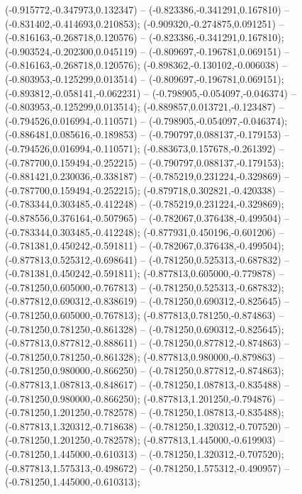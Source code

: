  (-0.915772,-0.347973,0.132347) -- (-0.823386,-0.341291,0.167810) -- (-0.831402,-0.414693,0.210853);
 (-0.909320,-0.274875,0.091251) -- (-0.816163,-0.268718,0.120576) -- (-0.823386,-0.341291,0.167810);
 (-0.903524,-0.202300,0.045119) -- (-0.809697,-0.196781,0.069151) -- (-0.816163,-0.268718,0.120576);
 (-0.898362,-0.130102,-0.006038) -- (-0.803953,-0.125299,0.013514) -- (-0.809697,-0.196781,0.069151);
 (-0.893812,-0.058141,-0.062231) -- (-0.798905,-0.054097,-0.046374) -- (-0.803953,-0.125299,0.013514);
 (-0.889857,0.013721,-0.123487) -- (-0.794526,0.016994,-0.110571) -- (-0.798905,-0.054097,-0.046374);
 (-0.886481,0.085616,-0.189853) -- (-0.790797,0.088137,-0.179153) -- (-0.794526,0.016994,-0.110571);
 (-0.883673,0.157678,-0.261392) -- (-0.787700,0.159494,-0.252215) -- (-0.790797,0.088137,-0.179153);
 (-0.881421,0.230036,-0.338187) -- (-0.785219,0.231224,-0.329869) -- (-0.787700,0.159494,-0.252215);
 (-0.879718,0.302821,-0.420338) -- (-0.783344,0.303485,-0.412248) -- (-0.785219,0.231224,-0.329869);
 (-0.878556,0.376164,-0.507965) -- (-0.782067,0.376438,-0.499504) -- (-0.783344,0.303485,-0.412248);
 (-0.877931,0.450196,-0.601206) -- (-0.781381,0.450242,-0.591811) -- (-0.782067,0.376438,-0.499504);
 (-0.877813,0.525312,-0.698641) -- (-0.781250,0.525313,-0.687832) -- (-0.781381,0.450242,-0.591811);
 (-0.877813,0.605000,-0.779878) -- (-0.781250,0.605000,-0.767813) -- (-0.781250,0.525313,-0.687832);
 (-0.877812,0.690312,-0.838619) -- (-0.781250,0.690312,-0.825645) -- (-0.781250,0.605000,-0.767813);
 (-0.877813,0.781250,-0.874863) -- (-0.781250,0.781250,-0.861328) -- (-0.781250,0.690312,-0.825645);
 (-0.877813,0.877812,-0.888611) -- (-0.781250,0.877812,-0.874863) -- (-0.781250,0.781250,-0.861328);
 (-0.877813,0.980000,-0.879863) -- (-0.781250,0.980000,-0.866250) -- (-0.781250,0.877812,-0.874863);
 (-0.877813,1.087813,-0.848617) -- (-0.781250,1.087813,-0.835488) -- (-0.781250,0.980000,-0.866250);
 (-0.877813,1.201250,-0.794876) -- (-0.781250,1.201250,-0.782578) -- (-0.781250,1.087813,-0.835488);
 (-0.877813,1.320312,-0.718638) -- (-0.781250,1.320312,-0.707520) -- (-0.781250,1.201250,-0.782578);
 (-0.877813,1.445000,-0.619903) -- (-0.781250,1.445000,-0.610313) -- (-0.781250,1.320312,-0.707520);
 (-0.877813,1.575313,-0.498672) -- (-0.781250,1.575312,-0.490957) -- (-0.781250,1.445000,-0.610313);
